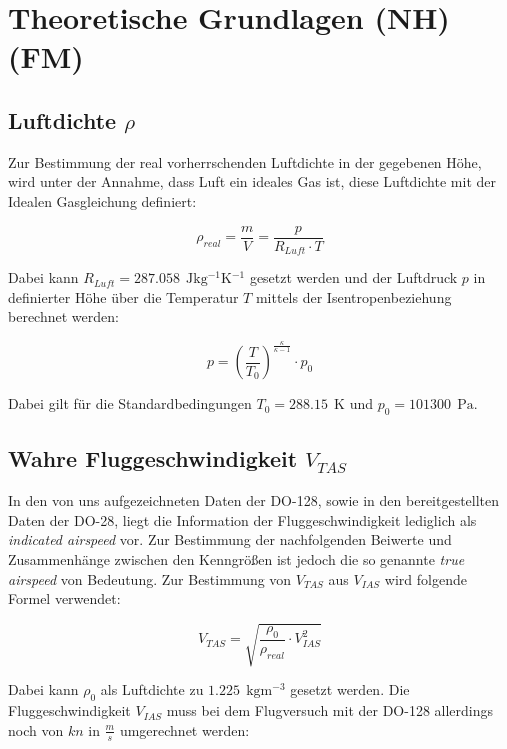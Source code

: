 \chapter{Theoretische Grundlagen (NH)(FM)}
\label{c:TheoGrund}

\section{Luftdichte $\rho$}

Zur Bestimmung der real vorherrschenden Luftdichte in der gegebenen Höhe, wird unter der Annahme, dass Luft ein ideales Gas ist, diese Luftdichte mit der Idealen Gasgleichung definiert:

\begin{equation}
\rho_{real}=\frac{m}{V}=\frac{p}{R_{Luft} \cdot T}
\end{equation}

Dabei kann $R_{Luft}=\SI{287,058 }{\ \joule\kilogram^{-1}\kelvin^{-1}}$ gesetzt werden und der Luftdruck $p$ in definierter Höhe über die Temperatur $T$ mittels der Isentropenbeziehung berechnet werden:

\begin{equation}
p=\left(\frac{T}{T_0}\right)^{\frac{\kappa}{\kappa-1}} \cdot p_0
\end{equation}

Dabei gilt für die Standardbedingungen $T_0=\SI{288,15}{\ \kelvin}$ und $p_0=\SI{101300}{\ \pascal}$.

\section{Wahre Fluggeschwindigkeit $V_{TAS}$}

In den von uns aufgezeichneten Daten der DO-128, sowie in den bereitgestellten Daten der DO-28, liegt die Information der Fluggeschwindigkeit lediglich als \textit{indicated airspeed} vor. Zur Bestimmung der nachfolgenden Beiwerte und Zusammenhänge zwischen den Kenngrößen ist jedoch die so genannte \textit{true airspeed} von Bedeutung. Zur Bestimmung von $V_{TAS}$ aus $V_{IAS}$ wird folgende Formel verwendet\cite{Kurzskript}:

\begin{equation}
V_{TAS}=\sqrt{\frac{\rho_0}{\rho_{real}} \cdot V_{IAS}^2}
\end{equation}

Dabei kann $\rho_0$ als Luftdichte zu $\SI{1,225}{\ \kilogram\meter^{-3}}$ gesetzt werden. Die Fluggeschwindigkeit $V_{IAS}$ muss bei dem Flugversuch mit der DO-128 allerdings noch von $kn$ in $\frac{m}{s}$ umgerechnet werden:

